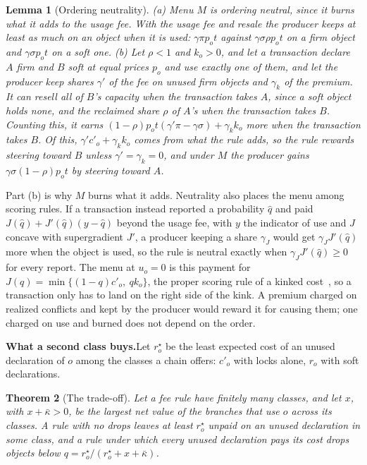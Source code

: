 \documentclass[conference,compsoc]{IEEEtran}
\numberwithin{equation}{section}
\theoremstyle{plain}
\newtheorem{theorem}{Theorem}[section]
\newtheorem{lemma}[theorem]{Lemma}
\theoremstyle{definition}
\theoremstyle{remark}
\newcommand{\runin}[1]{\par\smallskip\noindent\textbf{#1.}\enspace}
\newcommand{\cp}{c'}
\begin{document}
\begin{lemma}[Ordering neutrality]\label{prop:neutral}
\textup{(a)} Menu $M$ is ordering neutral, since it burns what it adds to the usage fee. With the usage fee and resale the producer keeps at least as much on an object when it is used: $\gamma \pi p_o t$ against $\gamma\sigma\rho p_o t$ on a firm object and $\gamma\sigma p_o t$ on a soft one. \textup{(b)} Let $\rho < 1$ and $k_o > 0$, and let a transaction declare $A$ firm and $B$ soft at equal prices $p_o$ and use exactly one of them, and let the producer keep shares $\gamma'$ of the fee on unused firm objects and $\gamma_k$ of the premium. It can resell all of $B$'s capacity when the transaction takes $A$, since a soft object holds none, and the reclaimed share $\rho$ of $A$'s when the transaction takes $B$. Counting this, it earns $(1-\rho) p_o t (\gamma'\pi - \gamma\sigma) + \gamma_k k_o$ more when the transaction takes $B$. Of this, $\gamma'\cp_o + \gamma_k k_o$ comes from what the rule adds, so the rule rewards steering toward $B$ unless $\gamma' = \gamma_k = 0$, and under $M$ the producer gains $\gamma\sigma(1-\rho)p_o t$ by steering toward $A$.
\end{lemma}

Part (b) is why $M$ burns what it adds. Neutrality also places the menu among scoring rules. If a transaction instead reported a probability $\hat q$ and paid $J(\hat q) + J'(\hat q)(y - \hat q)$ beyond the usage fee, with $y$ the indicator of use and $J$ concave with supergradient $J'$, a producer keeping a share $\gamma_J$ would get $\gamma_J J'(\hat q)$ more when the object is used, so the rule is neutral exactly when $\gamma_J J'(\hat q) \ge 0$ for every report. The menu at $u_o = 0$ is this payment for $J(q) = \min\{(1-q)\cp_o,\ q k_o\}$, the proper scoring rule of a kinked cost~\cite{gneiting2007strictly}, so a transaction only has to land on the right side of the kink. A premium charged on realized conflicts and kept by the producer would reward it for causing them; one charged on use and burned does not depend on the order.

\runin{What a second class buys}Let $r^\star_o$ be the least expected cost of an unused declaration of $o$ among the classes a chain offers: $\cp_o$ with locks alone, $r_o$ with soft declarations.

\begin{theorem}[The trade-off]\label{thm:floor}
Let a fee rule have finitely many classes, and let $x$, with $x + \bar\kappa > 0$, be the largest net value of the branches that use $o$ across its classes. A rule with no drops leaves at least $r^\star_o$ unpaid on an unused declaration in some class, and a rule under which every unused declaration pays its cost drops objects below $q = r^\star_o/(r^\star_o + x + \bar\kappa)$.
\end{theorem}
\end{document}
